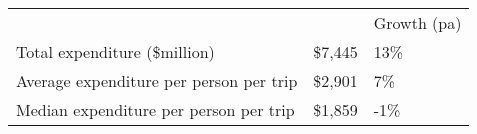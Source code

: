 \begin{tabular}[t]{p{5.1cm}>{\hfill}p{1.1cm}>{\hfill}p{1.3cm}}
    &   & Growth (pa) \\ 
 Total expenditure (\$million) & \$7,445 & 13\% \\ 
  Average expenditure per person per trip & \$2,901 & 7\% \\ 
  Median expenditure per person per trip & \$1,859 & -1\% \\ 
  \end{tabular}

